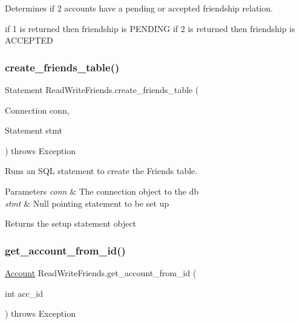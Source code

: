 Determines if 2 accounts have a pending or accepted friendship relation. 

if 1 is returned then friendship is P\+E\+N\+D\+I\+NG if 2 is returned then friendship is A\+C\+C\+E\+P\+T\+ED \mbox{\label{class_read_write_friends_abd8ff6b1154e07ae729ce151d7160fa9}} 
\subsubsection{\texorpdfstring{create\+\_\+friends\+\_\+table()}{create\_friends\_table()}}
{\footnotesize\ttfamily Statement Read\+Write\+Friends.\+create\+\_\+friends\+\_\+table (\begin{DoxyParamCaption}\item[{Connection}]{conn,  }\item[{Statement}]{stmt }\end{DoxyParamCaption}) throws Exception}



Runs an S\+QL statement to create the Friends table. 


\begin{DoxyParams}{Parameters}
{\em conn} & The connection object to the db \\
\hline
{\em stmt} & Null pointing statement to be set up \\
\hline
\end{DoxyParams}
\begin{DoxyReturn}{Returns}
the setup statement object 
\end{DoxyReturn}
\mbox{\label{class_read_write_friends_a56f74832f8bc0bee6c7d48aad84878eb}} 
\subsubsection{\texorpdfstring{get\+\_\+account\+\_\+from\+\_\+id()}{get\_account\_from\_id()}}
{\footnotesize\ttfamily \hyperlink{class_account}{Account} Read\+Write\+Friends.\+get\+\_\+account\+\_\+from\+\_\+id (\begin{DoxyParamCaption}\item[{int}]{acc\+\_\+id }\end{DoxyParamCaption}) throws Exception}



